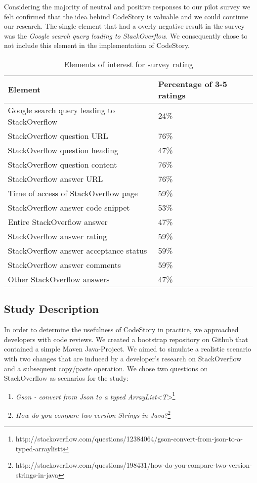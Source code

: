 \documentclass[../manifest.tex]{subfiles}
\begin{document}
Considering the majority of neutral and positive responses to our pilot survey we felt confirmed that the idea behind CodeStory is valuable and we could continue our research. The single element that had a overly negative result in the survey was the \textit{Google search query leading to StackOverflow}. We consequently chose to not include this element in the implementation of CodeStory.

\begin{table*}[t]
    \centering
    \begin{threeparttable}
    \begin{tabular*}{\textwidth}{ll}
    \hline
    \textbf{Element} & \textbf{Percentage of 3-5 ratings} \\
    \hline
    Google search query leading to StackOverflow & 24\% \\
    StackOverflow question URL & 76\% \\
    StackOverflow question heading & 47\% \\
    StackOverflow question content & 76\% \\
    StackOverflow answer URL & 76\% \\
    Time of access of StackOverflow page & 59\% \\
    StackOverflow answer code snippet & 53\% \\
    Entire StackOverflow answer & 47\% \\
    StackOverflow answer rating & 59\% \\
    StackOverflow answer acceptance status & 59\% \\
    StackOverflow answer comments & 59\% \\
    Other StackOverflow answers & 47\% \\
    \hline
    \end{tabular*}
    \end{threeparttable}
    \caption{Elements of interest for survey rating}
    \label{tab:elements-of-interest}
\end{table*}

\subsection{Study Description} \label{eval-description}

In order to determine the usefulness of CodeStory in practice, we approached developers with code reviews. We created a bootstrap repository on Github that contained a simple Maven Java-Project. We aimed to simulate a realistic scenario with two changes that are induced by a developer's research on StackOverflow and a subsequent copy/paste operation. We chose two questions on StackOverflow as scenarios for the study:
\begin{enumerate}
  \item \textit{Gson - convert from Json to a typed ArrayList<T>}\footnote{http://stackoverflow.com/questions/12384064/gson-convert-from-json-to-a-typed-arraylistt}
  \item \textit{How do you compare two version Strings in Java?}\footnote{http://stackoverflow.com/questions/198431/how-do-you-compare-two-version-strings-in-java}
\end{enumerate}
\end{document}

